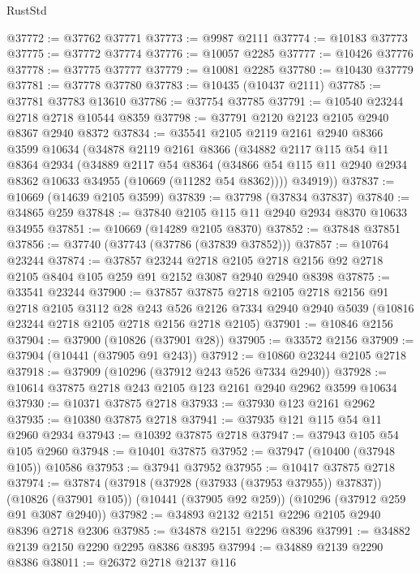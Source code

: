 \begin{lexlean}{RustStd}
\begin{coremodule}
@37772 := @37762 @37771
@37773 := @9987 @2111
@37774 := @10183 @37773
@37775 := @37772 @37774
@37776 := @10057 @2285
@37777 := @10426 @37776
@37778 := @37775 @37777
@37779 := @10081 @2285
@37780 := @10430 @37779
@37781 := @37778 @37780
@37783 := @10435 (@10437 @2111)
@37785 := @37781 @37783 @13610
@37786 := @37754 @37785
@37791 := @10540 @23244 @2718 @2718 @10544 @8359
@37798 := @37791 @2120 @2123 @2105 @2940 @8367 @2940 @8372
@37834 := @35541
    @2105
    @2119
    @2161
    @2940
    @8366
    @3599
    @10634
    (@34878
      @2119
      @2161
      @8366
      (@34882
        @2117
        @115
        @54
        @11
        @8364
        @2934
        (@34889
          @2117
          @54
          @8364
          (@34866 @54 @115 @11 @2940 @2934 @8362 @10633 @34955 (@10669 (@11282 @54 @8362))))
        @34919))
@37837 := @10669 (@14639 @2105 @3599)
@37839 := @37798 (@37834 @37837)
@37840 := @34865 @259
@37848 := @37840 @2105 @115 @11 @2940 @2934 @8370 @10633 @34955
@37851 := @10669 (@14289 @2105 @8370)
@37852 := @37848 @37851
@37856 := @37740 (@37743 (@37786 (@37839 @37852)))
@37857 := @10764 @23244
@37874 := @37857
    @23244
    @2718
    @2105
    @2718
    @2156
    @92
    @2718
    @2105
    @8404
    @105
    @259
    @91
    @2152
    @3087
    @2940
    @2940
    @8398
@37875 := @33541 @23244
@37900 := @37857
    @37875
    @2718
    @2105
    @2718
    @2156
    @91
    @2718
    @2105
    @3112
    @28
    @243
    @526
    @2126
    @7334
    @2940
    @2940
    @5039
    (@10816 @23244 @2718 @2105 @2718 @2156 @2718 @2105)
@37901 := @10846 @2156
@37904 := @37900 (@10826 (@37901 @28))
@37905 := @33572 @2156
@37909 := @37904 (@10441 (@37905 @91 @243))
@37912 := @10860 @23244 @2105 @2718
@37918 := @37909 (@10296 (@37912 @243 @526 @7334 @2940))
@37928 := @10614 @37875 @2718 @243 @2105 @123 @2161 @2940 @2962 @3599 @10634
@37930 := @10371 @37875 @2718
@37933 := @37930 @123 @2161 @2962
@37935 := @10380 @37875 @2718
@37941 := @37935 @121 @115 @54 @11 @2960 @2934
@37943 := @10392 @37875 @2718
@37947 := @37943 @105 @54 @105 @2960
@37948 := @10401 @37875
@37952 := @37947 (@10400 (@37948 @105)) @10586
@37953 := @37941 @37952
@37955 := @10417 @37875 @2718
@37974 := @37874
    (@37918 (@37928 (@37933 (@37953 @37955)) @37837))
    (@10826 (@37901 @105))
    (@10441 (@37905 @92 @259))
    (@10296 (@37912 @259 @91 @3087 @2940))
@37982 := @34893 @2132 @2151 @2296 @2105 @2940 @8396 @2718 @2306
@37985 := @34878 @2151 @2296 @8396
@37991 := @34882 @2139 @2150 @2290 @2295 @8386 @8395
@37994 := @34889 @2139 @2290 @8386
@38011 := @26372
    @2718
    @2137
    @116

\end{coremodule}
\end{lexlean}
